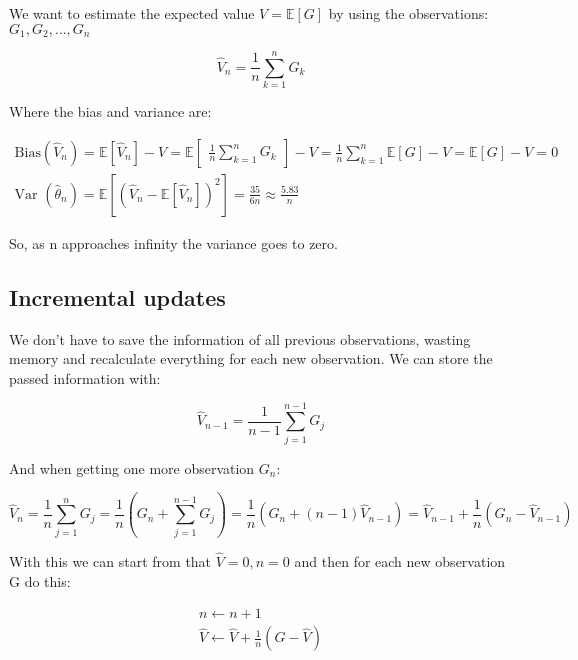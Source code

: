 We want to estimate the expected value $V =\mathbb{E}[G]$ by using the observations: $G_1, G_2, \ldots,G_n$

	\begin{equation}
		\hat{V}_n = \frac{1} {n} \sum_{k=1}^{n}G_k
	\end{equation}

Where the bias and variance are: 

	\begin{equation}
	\begin{aligned}
		\text{Bias}(\hat{V}_n) = \mathbb{E}[\hat{V}_n] - V = \mathbb{E} \begin{bmatrix} \frac{1} {n} \sum_{k=1}^{n}G_k  \end{bmatrix} -V = \frac{1} {n} \sum_{k=1}^{n} \mathbb{E}[G] -V = \mathbb{E}[G] -V = 0 \\
		\text{Var }(\hat{\theta}_n) = \mathbb{E} [(\hat{V}_n - \mathbb{E}[\hat{V}_n])^{2}] = \frac{35} {6n} \approx \frac{5.83} {n}   
	\end{aligned}
	\end{equation}

So, as n approaches infinity the variance goes to zero. 

\subsection{Incremental updates}
We don't have to save the information of all previous observations, wasting memory and recalculate everything for each new observation. We can store the passed information with:

	\begin{equation}
		\hat{V}_{n-1} = \frac{1} {n-1} \sum_{j=1}^{n-1}G_j 
	\end{equation}

And when getting one more observation $G_n$:

	\begin{equation}
		\hat{V}_n = \frac{1} {n} \sum_{j=1}^{n}G_j = \frac{1} {n}(G_n + \sum_{j=1}^{n-1}G_j) = \frac{1} {n}(G_n + (n-1)\hat{V}_{n-1}) = \hat{V}_{n-1} + \frac{1} {n}(G_n - \hat{V}_{n-1})   
	\end{equation}

With this we can start from that $\hat{V} = 0, n = 0$ and then for each new observation G do this:

	\begin{equation}
	\begin{aligned}
		n \leftarrow n+1 \\
		\hat{V} \leftarrow \hat{V} + \frac{1} {n}(G-\hat{V}) 
	\end{aligned}
	\end{equation}

